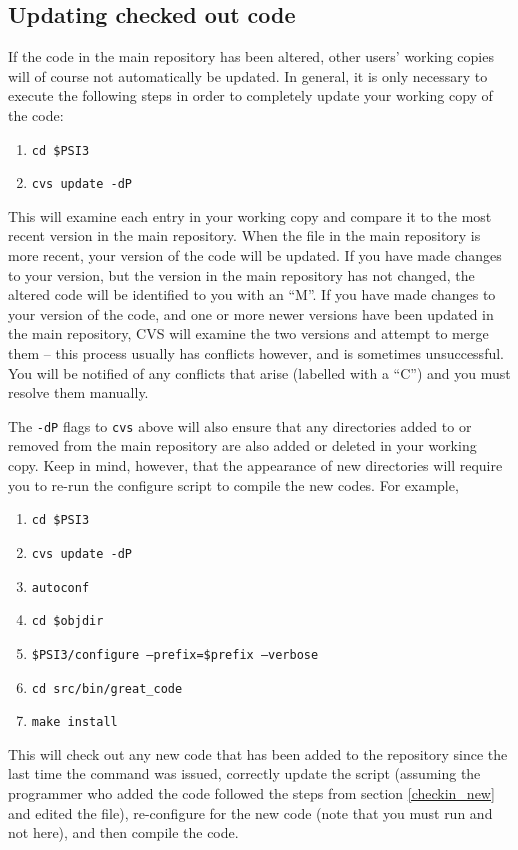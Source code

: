 \subsection{Updating checked out code}

If the code in the main repository has been altered, other users' working
copies will of course not automatically be updated.  In general, it is
only necessary to execute the following steps in order to completely update
your working copy of the code:

\begin{enumerate}
\item {\tt cd \$PSI3}
\item {\tt cvs update -dP}
\end{enumerate}

This will examine each entry in your working copy and compare it to the most
recent version in the main repository. When the file in the main repository
is more recent, your version of the code will be updated. If you have made
changes to your version, but the version in the main repository has not
changed, the altered code will be identified to you with an ``M''. If you
have made changes to your version of the code, and one or more newer versions
have been updated in the main repository, CVS will examine the two versions
and attempt to merge them -- this process usually has conflicts however,
and is sometimes unsuccessful. You will be notified of any conflicts that
arise (labelled with a ``C'') and you must resolve them manually.

The {\tt -dP} flags to {\tt cvs} above will also ensure that any
directories added to or removed from the main repository are also added or
deleted in your working copy.  Keep in mind, however, that the appearance
of new directories will require you to re-run the configure script to
compile the new codes.  For example,

\begin{enumerate}
\item {\tt cd \$PSI3}
\item {\tt cvs update -dP}
\item {\tt autoconf}
\item {\tt cd \$objdir}
\item {\tt \$PSI3/configure --prefix=\$prefix --verbose}
\item {\tt cd src/bin/great\_code}
\item {\tt make install}
\end{enumerate}
This will check out any new code that has been added to the repository since 
the last time the  command was issued, correctly update 
the  script (assuming the programmer who added the code 
followed the steps from section \ref{checkin_new} and edited the 
 file), re-configure for the new code (note that
you must run  and not  here), and 
then compile the code.

